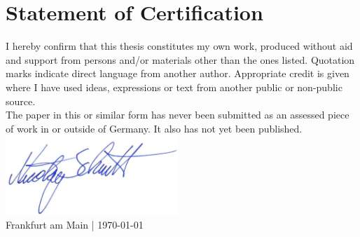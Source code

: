 \chapter*{Statement of Certification}

I hereby confirm that this thesis constitutes my own work, produced without aid and support from persons and/or materials other than the ones listed. Quotation marks indicate direct language from another author. Appropriate credit is given where I have used ideas, expressions or text from another public or non-public source.\\

The paper in this or similar form has never been submitted as an assessed piece of work in or outside of Germany. It also has not yet been published.\\

\includegraphics[width=65mm]{text/signatureNicolaySchmitt.png}\\
Frankfurt am Main | \today
